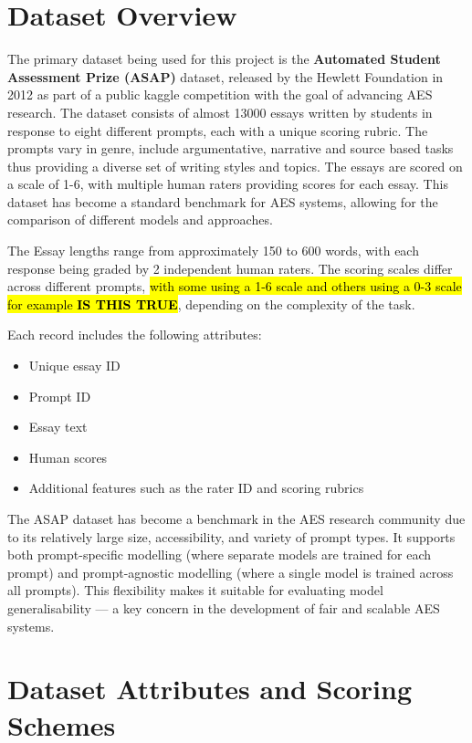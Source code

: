 \documentclass[8pt]{report}
\begin{document}
\section{Dataset Overview}
The primary dataset being used for this project is the \textbf{Automated Student Assessment Prize (ASAP)} dataset, released by the Hewlett Foundation in 2012 as part of a public kaggle competition with the goal of advancing 
AES research. The dataset consists of almost 13000 essays written by students in response to eight different prompts, each with a unique scoring rubric. The prompts vary in genre, include argumentative, narrative and source based tasks thus providing a diverse set 
of writing styles and topics. The essays are scored on a scale of 1-6, with multiple human raters providing scores for each essay. This dataset has become a standard benchmark for AES systems, allowing for the comparison of different models and approaches.

The Essay lengths range from approximately 150 to 600 words, with each response being graded by 2 independent human raters. The scoring scales differ across different prompts, \hl{with some using a 1-6 scale and others using a 0-3 scale for example \textbf{IS THIS 
TRUE}}, depending on the complexity of the task.

Each record includes the following attributes:
\begin{itemize}
    \item Unique essay ID
    \item Prompt ID
    \item Essay text
    \item Human scores
    \item Additional features such as the rater ID and scoring rubrics
\end{itemize}

The ASAP dataset has become a benchmark in the AES research community due to its relatively large size, accessibility, and variety of prompt types. It supports both prompt-specific modelling (where separate models are trained for each prompt) and prompt-agnostic 
modelling (where a single model is trained across all prompts). This flexibility makes it suitable for evaluating model generalisability — a key concern in the development of fair and scalable AES systems.

\section{Dataset Attributes and Scoring Schemes}
\end{document}
